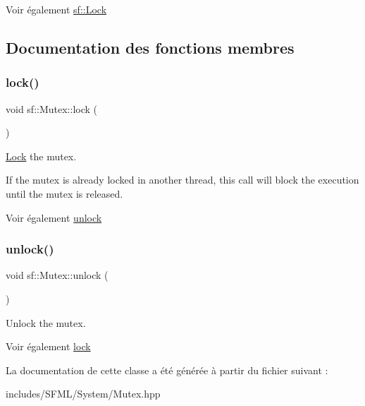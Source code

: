 \begin{DoxySeeAlso}{Voir également}
\hyperlink{classsf_1_1Lock}{sf\+::\+Lock} 
\end{DoxySeeAlso}


\subsection{Documentation des fonctions membres}
\mbox{\label{classsf_1_1Mutex_a1a16956a6bbea764480c1b80f2e45763}} 
\subsubsection{\texorpdfstring{lock()}{lock()}}
{\footnotesize\ttfamily void sf\+::\+Mutex\+::lock (\begin{DoxyParamCaption}{ }\end{DoxyParamCaption})}



\hyperlink{classsf_1_1Lock}{Lock} the mutex. 

If the mutex is already locked in another thread, this call will block the execution until the mutex is released.

\begin{DoxySeeAlso}{Voir également}
\hyperlink{classsf_1_1Mutex_ade71268ffc5e80756652058b01c23c33}{unlock} 
\end{DoxySeeAlso}
\mbox{\label{classsf_1_1Mutex_ade71268ffc5e80756652058b01c23c33}} 
\subsubsection{\texorpdfstring{unlock()}{unlock()}}
{\footnotesize\ttfamily void sf\+::\+Mutex\+::unlock (\begin{DoxyParamCaption}{ }\end{DoxyParamCaption})}



Unlock the mutex. 

\begin{DoxySeeAlso}{Voir également}
\hyperlink{classsf_1_1Mutex_a1a16956a6bbea764480c1b80f2e45763}{lock} 
\end{DoxySeeAlso}


La documentation de cette classe a été générée à partir du fichier suivant \+:\begin{DoxyCompactItemize}
\item 
includes/\+S\+F\+M\+L/\+System/Mutex.\+hpp\end{DoxyCompactItemize}
